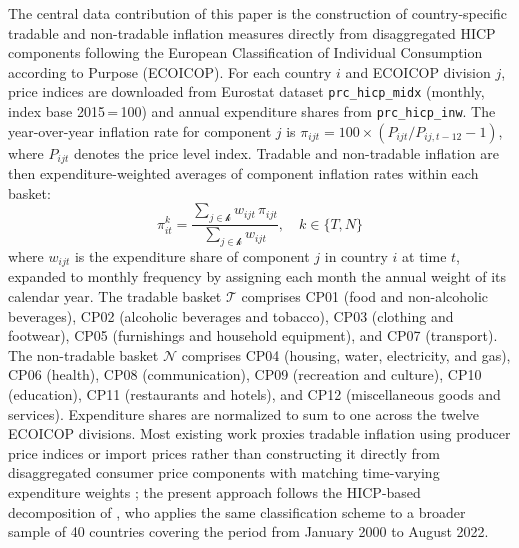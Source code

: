 \documentclass[a4paper,12pt]{article}
\begin{document}
The central data contribution of this paper is the construction of country-specific tradable and non-tradable inflation measures directly from disaggregated HICP components following the European Classification of Individual Consumption according to Purpose (ECOICOP). For each country $i$ and ECOICOP division $j$, price indices are downloaded from Eurostat dataset \texttt{prc\_hicp\_midx} (monthly, index base 2015\,=\,100) and annual expenditure shares from \texttt{prc\_hicp\_inw}. The year-over-year inflation rate for component $j$ is $\pi_{ijt} = 100\times(P_{ijt}/P_{ij,t-12}-1)$, where $P_{ijt}$ denotes the price level index. Tradable and non-tradable inflation are then expenditure-weighted averages of component inflation rates within each basket:
\begin{equation}
    \pi^k_{it} = \frac{\sum_{j \in \mathcal{k}} w_{ijt} \, \pi_{ijt}}{\sum_{j \in \mathcal{k}} w_{ijt}},
    \quad k \in \{T, N\}
    \label{eq:basket}
\end{equation}
where $w_{ijt}$ is the expenditure share of component $j$ in country $i$ at time $t$, expanded to monthly frequency by assigning each month the annual weight of its calendar year. The tradable basket $\mathcal{T}$ comprises CP01 (food and non-alcoholic beverages), CP02 (alcoholic beverages and tobacco), CP03 (clothing and footwear), CP05 (furnishings and household equipment), and CP07 (transport). The non-tradable basket $\mathcal{N}$ comprises CP04 (housing, water, electricity, and gas), CP06 (health), CP08 (communication), CP09 (recreation and culture), CP10 (education), CP11 (restaurants and hotels), and CP12 (miscellaneous goods and services). Expenditure shares are normalized to sum to one across the twelve ECOICOP divisions. Most existing work proxies tradable inflation using producer price indices or import prices rather than constructing it directly from disaggregated consumer price components with matching time-varying expenditure weights \cite{HaKoseOhnsorge2023}; the present approach follows the HICP-based decomposition of , who applies the same classification scheme to a broader sample of 40 countries covering the period from January 2000 to August 2022.
\end{document}
